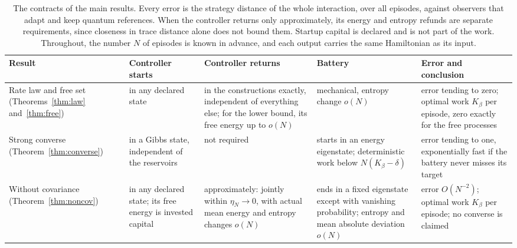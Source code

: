 \documentclass[11pt]{article}
\theoremstyle{definition}
\theoremstyle{remark}
\newcommand{\Kb}{K_\beta}
\begin{document}
\begin{table}[ht]
\centering
\small
\begin{tabular}{@{}>{\raggedright\arraybackslash}p{2.3cm}>{\raggedright\arraybackslash}p{2.4cm}>{\raggedright\arraybackslash}p{3.1cm}>{\raggedright\arraybackslash}p{3.1cm}>{\raggedright\arraybackslash}p{3.4cm}@{}}
\toprule
Result & Controller starts & Controller returns & Battery & Error and conclusion\\
\midrule
Rate law and free set (Theorems~\ref{thm:law} and~\ref{thm:free}) & in any declared state & in the constructions exactly, independent of everything else; for the lower bound, its free energy up to $o(N)$ & mechanical, entropy change $o(N)$ & error tending to zero; optimal work $\Kb$ per episode, zero exactly for the free processes\\
Strong converse (Theorem~\ref{thm:converse}) & in a Gibbs state, independent of the reservoirs & not required & starts in an energy eigenstate; deterministic work below $N(\Kb-\delta)$ & error tending to one, exponentially fast if the battery never misses its target\\
Without covariance (Theorem~\ref{thm:noncov}) & in any declared state; its free energy is invested capital & approximately: jointly within $\eta_N\to0$, with actual mean energy and entropy changes $o(N)$ & ends in a fixed eigenstate except with vanishing probability; entropy and mean absolute deviation $o(N)$ & error $O(N^{-2})$; optimal work $\Kb$ per episode; no converse is claimed\\
\bottomrule
\end{tabular}
\caption{The contracts of the main results. Every error is the strategy distance of the whole interaction, over all episodes, against observers that adapt and keep quantum references. When the controller returns only approximately, its energy and entropy refunds are separate requirements, since closeness in trace distance alone does not bound them. Startup capital is declared and is not part of the work. Throughout, the number $N$ of episodes is known in advance, and each output carries the same Hamiltonian as its input.}\label{tab:contract}
\end{table}
\end{document}
